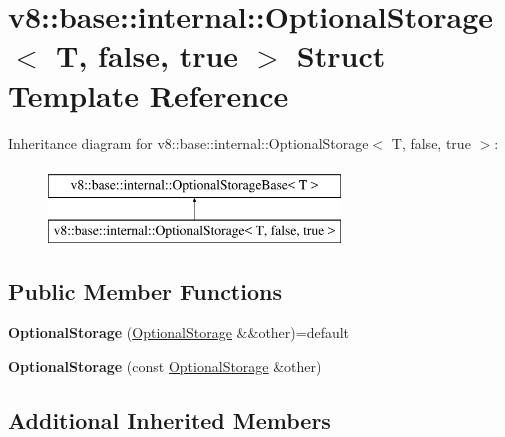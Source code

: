 \hypertarget{structv8_1_1base_1_1internal_1_1OptionalStorage_3_01T_00_01false_00_01true_01_4}{}\section{v8\+:\+:base\+:\+:internal\+:\+:Optional\+Storage$<$ T, false, true $>$ Struct Template Reference}
\label{structv8_1_1base_1_1internal_1_1OptionalStorage_3_01T_00_01false_00_01true_01_4}
Inheritance diagram for v8\+:\+:base\+:\+:internal\+:\+:Optional\+Storage$<$ T, false, true $>$\+:\begin{figure}[H]
\begin{center}
\leavevmode
\includegraphics[height=2.000000cm]{structv8_1_1base_1_1internal_1_1OptionalStorage_3_01T_00_01false_00_01true_01_4}
\end{center}
\end{figure}
\subsection*{Public Member Functions}
\begin{DoxyCompactItemize}
\item 
\mbox{\label{structv8_1_1base_1_1internal_1_1OptionalStorage_3_01T_00_01false_00_01true_01_4_a9e0d61d851c960dc2e5c2a96611f3267}} 
{\bfseries Optional\+Storage} (\mbox{\hyperlink{structv8_1_1base_1_1internal_1_1OptionalStorage}{Optional\+Storage}} \&\&other)=default
\item 
\mbox{\label{structv8_1_1base_1_1internal_1_1OptionalStorage_3_01T_00_01false_00_01true_01_4_a222878cab6eb9180525a6270bf56bfec}} 
{\bfseries Optional\+Storage} (const \mbox{\hyperlink{structv8_1_1base_1_1internal_1_1OptionalStorage}{Optional\+Storage}} \&other)
\end{DoxyCompactItemize}
\subsection*{Additional Inherited Members}


